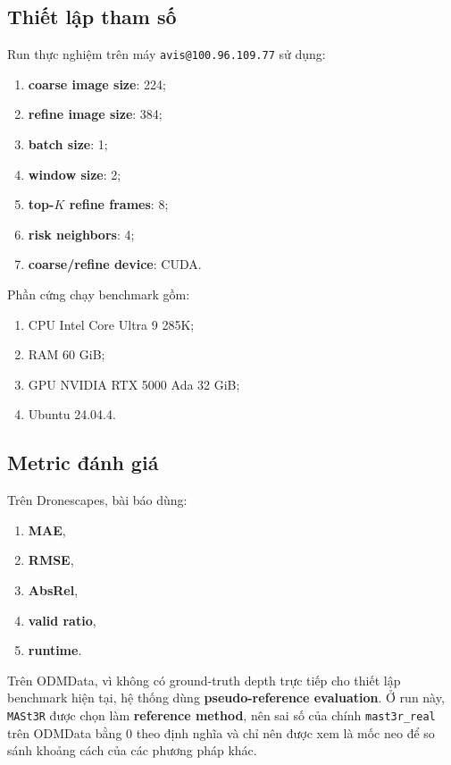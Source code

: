 \documentclass[11pt,a4paper]{article}
\begin{document}
\subsection{Thiết lập tham số}

Run thực nghiệm trên máy \texttt{avis@100.96.109.77} sử dụng:
\begin{enumerate}[leftmargin=1.5em]
  \item \textbf{coarse image size}: 224;
  \item \textbf{refine image size}: 384;
  \item \textbf{batch size}: 1;
  \item \textbf{window size}: 2;
  \item \textbf{top-$K$ refine frames}: 8;
  \item \textbf{risk neighbors}: 4;
  \item \textbf{coarse/refine device}: CUDA.
\end{enumerate}

Phần cứng chạy benchmark gồm:
\begin{enumerate}[leftmargin=1.5em]
  \item CPU Intel Core Ultra 9 285K;
  \item RAM 60 GiB;
  \item GPU NVIDIA RTX 5000 Ada 32 GiB;
  \item Ubuntu 24.04.4.
\end{enumerate}

\subsection{Metric đánh giá}

Trên Dronescapes, bài báo dùng:
\begin{enumerate}[leftmargin=1.5em]
  \item \textbf{MAE},
  \item \textbf{RMSE},
  \item \textbf{AbsRel},
  \item \textbf{valid ratio},
  \item \textbf{runtime}.
\end{enumerate}

Trên ODMData, vì không có ground-truth depth trực tiếp cho thiết lập benchmark hiện tại, hệ thống dùng \textbf{pseudo-reference evaluation}. Ở run này, \texttt{MASt3R} được chọn làm \textbf{reference method}, nên sai số của chính \texttt{mast3r\_real} trên ODMData bằng 0 theo định nghĩa và chỉ nên được xem là mốc neo để so sánh khoảng cách của các phương pháp khác.
\end{document}
